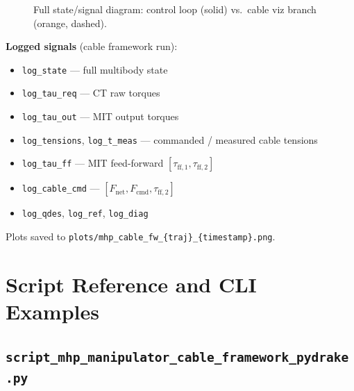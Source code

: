 \documentclass[11pt,a4paper]{article}
\begin{document}
\begin{figure}[H]
{%
}
\caption{Full state/signal diagram: control loop (solid) vs.\ cable viz branch (orange, dashed).}
\label{fig:fulldiag}
\end{figure}

\textbf{Logged signals} (cable framework run):
\begin{itemize}[noitemsep]
  \item \texttt{log\_state} --- full multibody state
  \item \texttt{log\_tau\_req} --- CT raw torques
  \item \texttt{log\_tau\_out} --- MIT output torques
  \item \texttt{log\_tensions}, \texttt{log\_t\_meas} --- commanded / measured cable tensions
  \item \texttt{log\_tau\_ff} --- MIT feed-forward $[\tau_{\mathrm{ff},1}, \tau_{\mathrm{ff},2}]$
  \item \texttt{log\_cable\_cmd} --- $[F_{\mathrm{net}}, F_{\mathrm{cmd}}, \tau_{\mathrm{ff},2}]$
  \item \texttt{log\_qdes}, \texttt{log\_ref}, \texttt{log\_diag}
\end{itemize}

Plots saved to \texttt{plots/mhp\_cable\_fw\_\{traj\}\_\{timestamp\}.png}.

\section{Script Reference and CLI Examples}

\subsection{\texttt{script\_mhp\_manipulator\_cable\_framework\_pydrake.py}}
\end{document}
